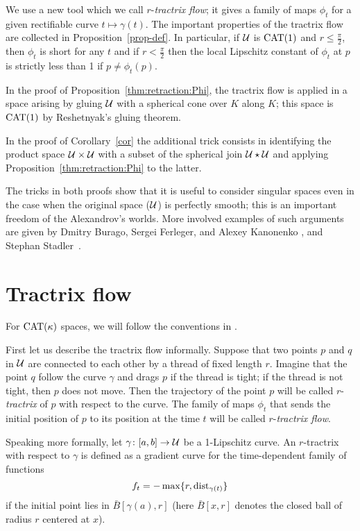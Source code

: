 \documentclass[oneside,a4paper, 12pt]{article}
\begin{document}
We use a new tool which we call $r$-\emph{tractrix flow}; it gives a family of maps $\phi_t$ for a given rectifiable curve $t\mapsto\gamma(t)$.
The important properties of the tractrix flow are collected in Proposition~\ref{prop-def}.
In particular, if $\mathcal{U}$ is $\mathrm{CAT}(1)$ and $r\le \tfrac\pi2$, then $\phi_t$ is short for any $t$ 
and if $r< \tfrac\pi2$ then the local Lipschitz constant of $\phi_t$ at $p$ is strictly less than 1 if $p\ne \phi_t(p)$.

In the proof of Proposition~\ref{thm:retraction:Phi}, the tractrix flow is applied in a space arising by gluing $\mathcal{U}$ with a spherical cone over $K$ along $K$;
this space is $\mathrm{CAT}(1)$ by Reshetnyak's gluing theorem.

In the proof of Corollary~\ref{cor} the additional trick consists in identifying the product space $\spc{U}\z\times \spc{U}$ with a subset of the spherical join $\mathcal{U}\star \mathcal{U}$ and applying  Proposition~\ref{thm:retraction:Phi} to the latter.

The tricks in both proofs show that it is useful to consider singular spaces even in the case when the original space ($\mathcal{U}$) is perfectly smooth;
this is an important freedom of the Alexandrov's worlds.
More involved examples of such arguments are given by Dmitry Burago, Sergei Ferleger, and Alexey Kanonenko \cite{BFK}, and Stephan Stadler~\cite{stadler}.

\section{Tractrix flow}\label{sec:Tractrix flow}

For $\mathrm{CAT}(\kappa)$ spaces, we will follow the conventions in \cite{akp}.

First let us describe the tractrix flow informally.
Suppose that two points $p$ and $q$ in ${\mathcal{U}}$ are connected to each other by a thread of fixed length $r$.
Imagine that the point $q$ follow the curve $\gamma$ and drags $p$ if the thread is tight; 
if the thread is not tight, then $p$ does not move.
Then the trajectory of the point $p$ will be called $r$-\emph{tractrix} of $p$ with respect to the curve.
The family of maps $\phi_t$ that sends the initial position of $p$ to its position at the time $t$ will be called $r$-\emph{tractrix flow}.

Speaking more formally, let $\gamma\colon[a,b]\to \mathcal{U}$ be a 1-Lipschitz curve. 
An $r$-tractrix with respect to $\gamma$ is defined as a gradient curve for the time-dependent family of functions 
\[f_t=- \max\{r,\mathop{\rm dist}\nolimits_{\gamma(t)}\}\]
if the initial point lies in $\bar B[\gamma(a),r]$
(here $\bar B[x,r]$ denotes the closed ball of radius $r$ centered at $x$).
\end{document}

